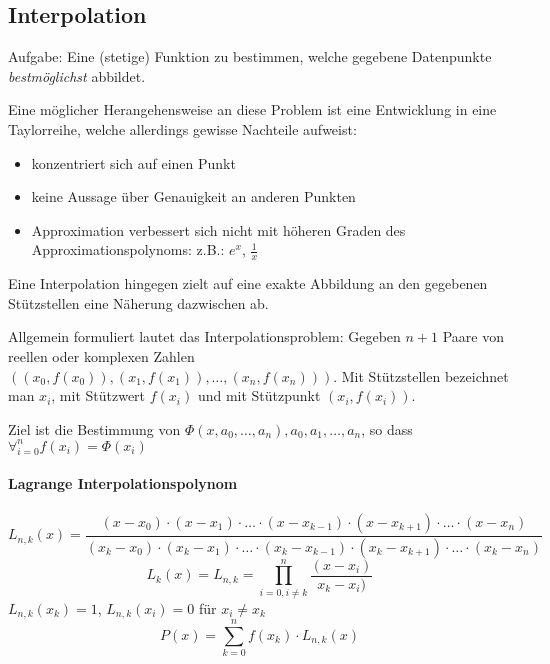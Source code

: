 \subsection{Interpolation}
Aufgabe: Eine (stetige) Funktion zu bestimmen, welche gegebene Datenpunkte \textit{bestmöglichst} abbildet.

Eine möglicher Herangehensweise an diese Problem ist eine Entwicklung in eine Taylorreihe, welche allerdings gewisse Nachteile aufweist:
\begin{itemize}
	\item konzentriert sich auf einen Punkt
	\item keine Aussage über Genauigkeit an anderen Punkten
	\item Approximation verbessert sich nicht mit höheren Graden des Approximationspolynoms: z.B.: $e^x$, $\frac{1}{x}$
\end{itemize}
		
Eine Interpolation hingegen zielt auf eine exakte Abbildung an den gegebenen Stützstellen eine Näherung dazwischen ab.

Allgemein formuliert lautet das Interpolationsproblem: Gegeben $n + 1$ Paare von reellen oder komplexen Zahlen $\left( (x_0, f(x_0)), (x_1, f(x_1)), \ldots , (x_n, f(x_n)) \right)$. Mit Stützstellen bezeichnet man $x_i$, mit Stützwert $f(x_i)$ und mit Stützpunkt $(x_i, f(x_i))$.

Ziel ist die Bestimmung von $\Phi(x, a_0, \ldots, a_n), a_0, a_1, \ldots, a_n$, so dass $\forall_{i = 0}^n f(x_i) = \Phi(x_i)$

\paragraph{Lagrange Interpolationspolynom}
\begin{equation}
	L_{n, k} (x) = \frac{(x - x_0) \cdot (x - x_1) \cdot \ldots \cdot (x - x_{k-1}) \cdot (x - x_{k + 1}) \cdot \ldots \cdot (x - x_n)}{(x_k - x_0) \cdot (x_k - x_1) \cdot \ldots \cdot (x_k - x_{k - 1}) \cdot (x_k - x_{k + 1}) \cdot \ldots \cdot (x_k - x_n)}
\end{equation}
\begin{equation}
	L_k(x) = L_{n, k} = \prod_{i = 0, i \ne k}^n \frac{(x - x_i)}{x_k - x_i)}
\end{equation}
$L_{n, k}(x_k) = 1$, $L_{n, k}(x_i) = 0$ für $x_i \ne x_k$
\begin{equation}
	P(x) = \sum_{k = 0}^n f(x_k) \cdot L_{n, k}(x)
\end{equation}

